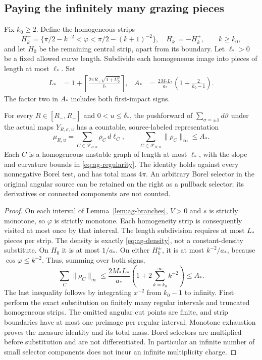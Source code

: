 \subsection{Paying the infinitely many grazing pieces}
Fix $k_0\ge2$. Define the homogeneous strips
\[
 H_k^+=\{\pi/2-k^{-2}<\varphi<\pi/2-(k+1)^{-2}\},\quad
 H_k^-=-H_k^+,\qquad k\ge k_0,
\]
and let $H_0$ be the remaining central strip, apart from its boundary.
Let $\ell_*>0$ be a fixed allowed curve length. Subdivide each
homogeneous image into pieces of length at most $\ell_*$. Set
\begin{align}
 L_*&=1+\left\lceil\frac{2\pi R_+\sqrt{1+U_0^2}}{\ell_*}\right\rceil,
 & A_*&=\frac{2M_*L_*}{a_*}
                    \left(1+\frac{2}{k_0-1}\right).
                                                  \label{eq:ag-budget}
\end{align}
The factor two in $A_*$ includes both first-impact signs.

\begin{theorem}
\label{thm:ag-family}
For every $R\in[R_-,R_+]$ and $0<u\le\delta_*$, the pushforward
of $\sum_{\sigma=\pm1}d\vartheta$ under the actual maps
$Y_{R,\sigma,u}$ has a countable, source-labeled representation
\begin{equation}\label{eq:ag-family}
       \mu_{R,u}=\sum_{C\in\mathcal F_{R,u}}\rho_C\,d\ell_C,
       \qquad \sum_{C\in\mathcal F_{R,u}}\|\rho_C\|_\infty\le A_*.
\end{equation}
Each $C$ is a homogeneous unstable graph of length at most $\ell_*$,
with the slope and curvature bounds in \eqref{eq:ag-regularity}.
The identity holds against every nonnegative Borel test, and has
total mass $4\pi$. An arbitrary Borel selector in the original
angular source can be retained on the right as a pullback selector;
its derivatives or connected components are not counted.
\end{theorem}
\begin{proof}
On each interval of Lemma~\ref{lem:ag-branches}, $V>0$ and $s$
is strictly monotone, so $\varphi$ is strictly monotone. Each
homogeneity strip is consequently visited at most once by that
interval. The length subdivision requires at most $L_*$ pieces
per strip. The density is exactly \eqref{eq:ag-density}, not a
constant-density substitute. On $H_0$ it is at most $1/a_*$. On
either $H_k^\pm$, it is at most $k^{-2}/a_*$, because
$\cos\varphi\le k^{-2}$. Thus, summing over both signs,
\[
 \sum_C\|\rho_C\|_\infty
 \le\frac{2M_*L_*}{a_*}
                   \left(1+2\sum_{k=k_0}^\infty k^{-2}\right)
 \le A_*.
\]
The last inequality follows by integrating $x^{-2}$ from $k_0-1$
to infinity. First perform the exact substitution on finitely many
regular intervals and truncated homogeneous strips. The omitted
angular cut points are finite, and strip boundaries have at most
one preimage per regular interval. Monotone exhaustion proves the
measure identity and its total mass. Borel selectors are multiplied
before substitution and are not differentiated. In particular an
infinite number of small selector components does not incur an
infinite multiplicity charge.
\end{proof}

